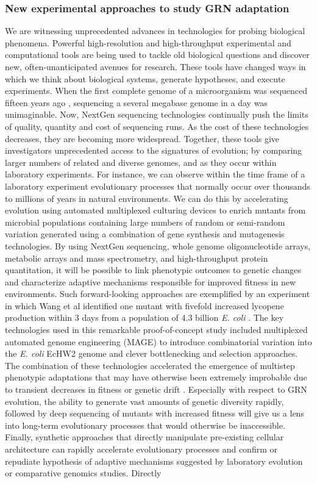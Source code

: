 \subsubsection{New experimental approaches to study GRN adaptation} 

We are witnessing unprecedented advances in technologies for probing biological phenomena.  Powerful high-resolution and high-throughput experimental and computational tools are being used to tackle old biological questions and discover new, often-unanticipated avenues for research. These tools have changed ways in which we think about biological systems, generate hypotheses, and execute experiments.  When the first complete genome of a microorganism was sequenced fifteen years ago \cite{fleischmann_whole-genome_1995}, sequencing a several megabase genome in a day was unimaginable. Now, NextGen sequencing technologies continually push the limits of quality, quantity and cost of sequencing runs. As the cost of these technologies decreases, they are becoming more widespread.  Together, these tools give investigators unprecedented access to the signatures of evolution; by comparing larger numbers of related and diverse genomes, and as they occur within laboratory experiments.  For instance, we can observe within the time frame of a laboratory experiment evolutionary processes that normally occur over thousands to millions of years in natural environments.  We can do this by accelerating evolution using automated multiplexed culturing devices to enrich mutants from microbial populations containing large numbers of random or semi-random variation generated using a combination of gene synthesis and mutagenesis technologies. By using NextGen sequencing, whole genome oligonucleotide arrays, metabolic arrays and mass spectrometry, and high-throughput protein quantitation, it will be possible to link phenotypic outcomes to genetic changes and characterize adaptive mechanisms responsible for improved fitness in new environments. Such forward-looking approaches are exemplified by an experiment in which Wang et al identified one mutant with fivefold increased lycopene production within 3 days from a population of 4.3 billion \textit{E. coli}  \cite{wang_programming_2009}. The key technologies used in this remarkable proof-of-concept study included multiplexed automated genome engineering (MAGE) to introduce combinatorial variation into the \textit{E. coli} EcHW2 genome and clever bottlenecking and selection approaches.  The combination of these technologies accelerated the emergence of multistep phenotypic adaptations that may have otherwise been extremely improbable due to transient decreases in fitness or genetic drift \cite{beaumont_experimental_2009}.  Especially with respect to GRN evolution, the ability to generate vast amounts of genetic diversity rapidly, followed by deep sequencing of mutants with increased fitness will give us a lens into long-term evolutionary processes that would otherwise be inaccessible.  Finally, synthetic approaches that directly manipulate pre-existing cellular architecture can rapidly accelerate evolutionary processes and confirm or repudiate hypothesis of adaptive mechanisms suggested by laboratory evolution or comparative genomics studies. Directly 